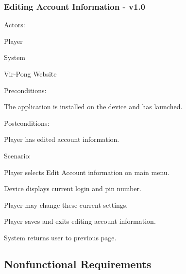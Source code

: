 \documentclass[12pt]{article}
\newenvironment{itemize*}%
  {\begin{itemize}%
  	\setlength{\parsep}{0pt}
    \setlength{\itemsep}{0pt}%
    \setlength{\parskip}{0pt}}%
  {\end{itemize}}
\newenvironment{enumerate*}%
  {\begin{enumerate}%
  	\setlength{\parsep}{0pt}
    \setlength{\itemsep}{0pt}%
    \setlength{\parskip}{0pt}}%
  {\end{enumerate}}
\begin{document}
\subsubsection*{Editing Account Information - v1.0}
Actors:
\begin{itemize*}
\item Player
\item System
\item Vir-Pong Website
\end{itemize*}
Preconditions:
\begin{itemize*}
\item The application is installed on the device and has launched.
\end{itemize*}
Postconditions:
\begin{itemize*}
\item Player has edited account information.
\end{itemize*}
Scenario:
\begin{enumerate*}
\item Player selects Edit Account information on main menu.
\item Device displays current login and pin number.
\item Player may change these current settings.
\item Player saves and exits editing account information.
\item System returns user to previous page.
\end{enumerate*} 

\onehalfspacing






\subsection{Nonfunctional Requirements}
\label{sec:nonfunctionalRequirements}
\end{document}
